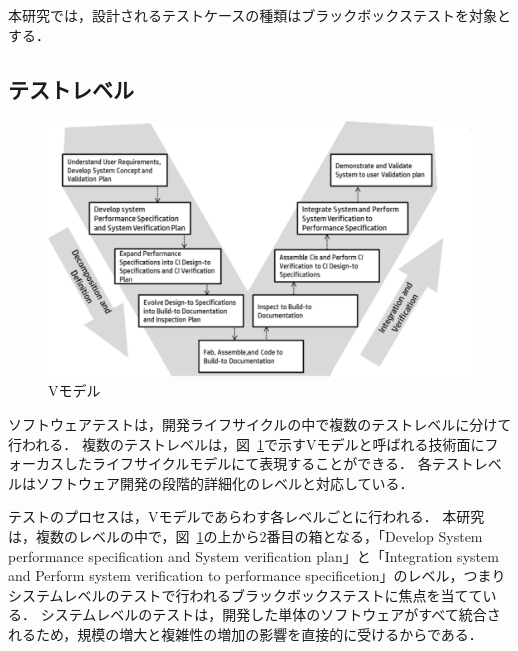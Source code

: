 本研究では，設計されるテストケースの種類はブラックボックステストを対象とする．

\subsection{テストレベル}

\begin{figure}[htbp]
  \begin{center}
  \includegraphics[width=12cm]{./image/D-2-Fig1.png}
  \caption{Vモデル}
  \label{fig:D-2-Fig1}
  \end{center}
\end{figure}
ソフトウェアテストは，開発ライフサイクルの中で複数のテストレベルに分けて行われる．
複数のテストレベルは，図~\ref{fig:D-2-Fig1}で示すVモデルと呼ばれる技術面にフォーカスしたライフサイクルモデルにて表現することができる\cite{forsberg}．
各テストレベルはソフトウェア開発の段階的詳細化のレベルと対応している．

テストのプロセスは，Vモデルであらわす各レベルごとに行われる．
本研究は，複数のレベルの中で，図~\ref{fig:D-2-Fig1}の上から2番目の箱となる，「Develop System performance specification and System verification plan」と「Integration system and Perform system verification to performance specificetion」のレベル，つまりシステムレベルのテストで行われるブラックボックステストに焦点を当てている．
システムレベルのテストは，開発した単体のソフトウェアがすべて統合されるため，規模の増大と複雑性の増加の影響を直接的に受けるからである．

